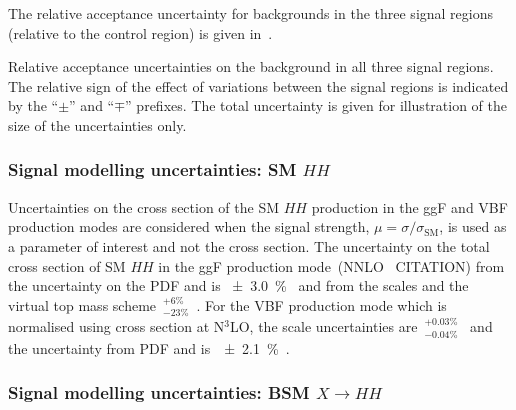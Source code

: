 The relative acceptance uncertainty for \ttbar backgrounds in the
three signal regions (relative to the \ZHF control region) is given
in~.

\begin{table}[htbp]
  \centering

  

  \caption{Relative acceptance uncertainties on the \ttbar background
    in all three signal regions. The relative sign of the effect of
    variations between the signal regions is indicated by the
    ``$\pm$'' and ``$\mp$'' prefixes. The total uncertainty is given
    for illustration of the size of the uncertainties only.}
  \label{tab:uncertainties_ttbar_extrapol}
\end{table}



\subsubsection{Signal modelling uncertainties: SM $HH$}


Uncertainties on the cross section of the SM $HH$ production in the
ggF and VBF production modes are considered when the signal strength,
$\mu = \sigma / \sigma_{\text{SM}}$, is used as a parameter of
interest and not the cross section. The uncertainty on the total cross
section of SM $HH$ in the ggF production mode~(NNLO
\FTapprox~CITATION) from the uncertainty on the PDF and \alphas is
\SI{\pm 3.0}{\percent}~\cite{LHCHWGHH} and from the scales and the
virtual top mass scheme~$^{+6\%}_{-23\%}$~\cite{Baglio:2020wgt}. For
the VBF production mode which is normalised using cross section at
N$^3$LO, the scale uncertainties
are~$^{+0.03\%}_{-0.04\%}$~\cite{LHCHWGHH} and the uncertainty from
PDF and \alphas is~\SI{\pm 2.1}{\percent}~\cite{LHCHWGHH}.










\subsubsection{Signal modelling uncertainties: BSM $X \to HH$}


